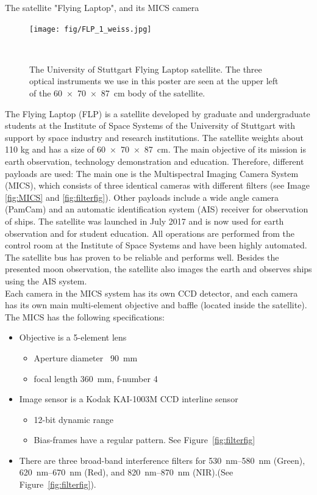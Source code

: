 \documentclass[final,hyperref={pdfpagelabels=false}]{beamer}
\begin{document}
\begin{frame}[t]
\begin{columns}[t]
\begin{column}{.23\textwidth}
\begin{block}{The satellite "Flying Laptop", and its MICS camera}
\begin{figure}
\texttt{[image: fig/FLP\_1\_weiss.jpg]}
\caption{The University of Stuttgart Flying Laptop satellite. The three optical instruments we use in this poster are seen at the upper left of the \SI[product-units = power]{60 x 70 x 87}{\centi\metre} body of the satellite.}~\label{fig:flp}
\end{figure}
The Flying Laptop (FLP) is a satellite developed by graduate and undergraduate students at the Institute of Space Systems of the University of Stuttgart with support by space industry and research institutions. The satellite weights about 110 kg and has a size of \SI[product-units = power]{60 x 70 x 87}{\centi\metre}. The main objective of its mission is earth observation, technology demonstration and education. Therefore, different payloads are used: The main one is the Multispectral Imaging Camera System (MICS), which consists of three identical cameras with different filters (see Image \ref{fig:MICS} and \ref{fig:filterfig}). Other payloads include a wide angle camera (PamCam) and an automatic identification system (AIS) receiver for observation of ships. The satellite was launched in July 2017 and is now used for earth observation and for student education. All operations are performed from the control room at the Institute of Space Systems and have been highly automated. The satellite bus has proven to be reliable and performs well. Besides the presented moon observation, the satellite also images the earth and observes ships using the AIS system. \\
Each camera in the MICS system has its own CCD detector, and each camera has its own main multi-element objective and baffle (located inside the satellite). The MICS has the following specifications:
\begin{itemize}
    \item Objective is a 5-element lens
    \begin{itemize}
        \item Aperture diameter ~\SI{90}{\milli\meter}
        \item focal length \SI{360}{\milli\metre}, f-number  4
    \end{itemize}
    \item Image sensor is a Kodak KAI-1003M CCD interline sensor 
    \begin{itemize}
        \item 12-bit dynamic range
        \item Bias-frames have a regular pattern. See Figure~\ref{fig:filterfig}
    \end{itemize}
    \item There are three broad-band interference filters for \SIrange{530}{580}{\nano\meter} (Green), \SIrange{620}{670}{\nano\meter} (Red), and \SIrange{820}{870}{\nano\meter} (NIR).(See Figure~\ref{fig:filterfig}).
\end{itemize}


\end{block}
\end{column}
\end{columns}
\end{frame}
\end{document}
